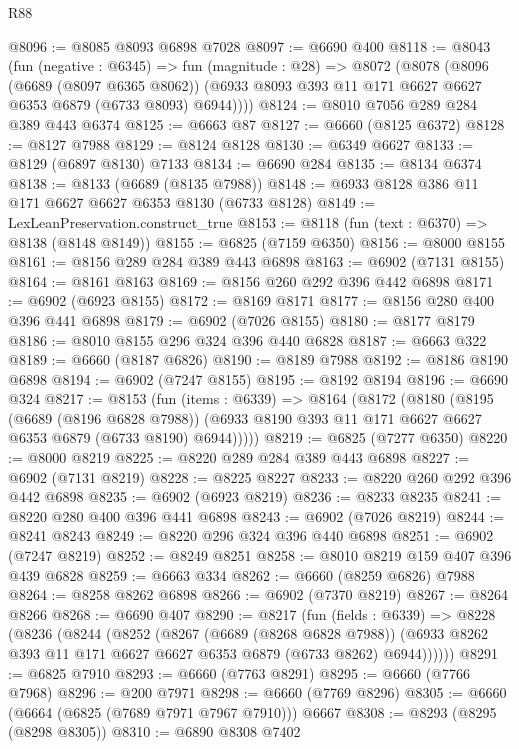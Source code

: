 \begin{lexlean}{R88}
\begin{coremodule}
@8096 := @8085 @8093 @6898 @7028
@8097 := @6690 @400
@8118 := @8043
    (fun (negative : @6345) =>
    fun (magnitude : @28) =>
    @8072
      (@8078
        (@8096
          (@6689 (@8097 @6365 @8062))
          (@6933 @8093 @393 @11 @171 @6627 @6627 @6353 @6879 (@6733 @8093) @6944))))
@8124 := @8010 @7056 @289 @284 @389 @443 @6374
@8125 := @6663 @87
@8127 := @6660 (@8125 @6372)
@8128 := @8127 @7988
@8129 := @8124 @8128
@8130 := @6349 @6627
@8133 := @8129 (@6897 @8130) @7133
@8134 := @6690 @284
@8135 := @8134 @6374
@8138 := @8133 (@6689 (@8135 @7988))
@8148 := @6933 @8128 @386 @11 @171 @6627 @6627 @6353 @8130 (@6733 @8128)
@8149 := LexLeanPreservation.construct_true
@8153 := @8118 (fun (text : @6370) => @8138 (@8148 @8149))
@8155 := @6825 (@7159 @6350)
@8156 := @8000 @8155
@8161 := @8156 @289 @284 @389 @443 @6898
@8163 := @6902 (@7131 @8155)
@8164 := @8161 @8163
@8169 := @8156 @260 @292 @396 @442 @6898
@8171 := @6902 (@6923 @8155)
@8172 := @8169 @8171
@8177 := @8156 @280 @400 @396 @441 @6898
@8179 := @6902 (@7026 @8155)
@8180 := @8177 @8179
@8186 := @8010 @8155 @296 @324 @396 @440 @6828
@8187 := @6663 @322
@8189 := @6660 (@8187 @6826)
@8190 := @8189 @7988
@8192 := @8186 @8190 @6898
@8194 := @6902 (@7247 @8155)
@8195 := @8192 @8194
@8196 := @6690 @324
@8217 := @8153
    (fun (items : @6339) =>
    @8164
      (@8172
        (@8180
          (@8195
            (@6689 (@8196 @6828 @7988))
            (@6933 @8190 @393 @11 @171 @6627 @6627 @6353 @6879 (@6733 @8190) @6944)))))
@8219 := @6825 (@7277 @6350)
@8220 := @8000 @8219
@8225 := @8220 @289 @284 @389 @443 @6898
@8227 := @6902 (@7131 @8219)
@8228 := @8225 @8227
@8233 := @8220 @260 @292 @396 @442 @6898
@8235 := @6902 (@6923 @8219)
@8236 := @8233 @8235
@8241 := @8220 @280 @400 @396 @441 @6898
@8243 := @6902 (@7026 @8219)
@8244 := @8241 @8243
@8249 := @8220 @296 @324 @396 @440 @6898
@8251 := @6902 (@7247 @8219)
@8252 := @8249 @8251
@8258 := @8010 @8219 @159 @407 @396 @439 @6828
@8259 := @6663 @334
@8262 := @6660 (@8259 @6826) @7988
@8264 := @8258 @8262 @6898
@8266 := @6902 (@7370 @8219)
@8267 := @8264 @8266
@8268 := @6690 @407
@8290 := @8217
    (fun (fields : @6339) =>
    @8228
      (@8236
        (@8244
          (@8252
            (@8267
              (@6689 (@8268 @6828 @7988))
              (@6933 @8262 @393 @11 @171 @6627 @6627 @6353 @6879 (@6733 @8262) @6944))))))
@8291 := @6825 @7910
@8293 := @6660 (@7763 @8291)
@8295 := @6660 (@7766 @7968)
@8296 := @200 @7971
@8298 := @6660 (@7769 @8296)
@8305 := @6660 (@6664 (@6825 (@7689 @7971 @7967 @7910))) @6667
@8308 := @8293 (@8295 (@8298 @8305))
@8310 := @6890 @8308 @7402

\end{coremodule}
\end{lexlean}
